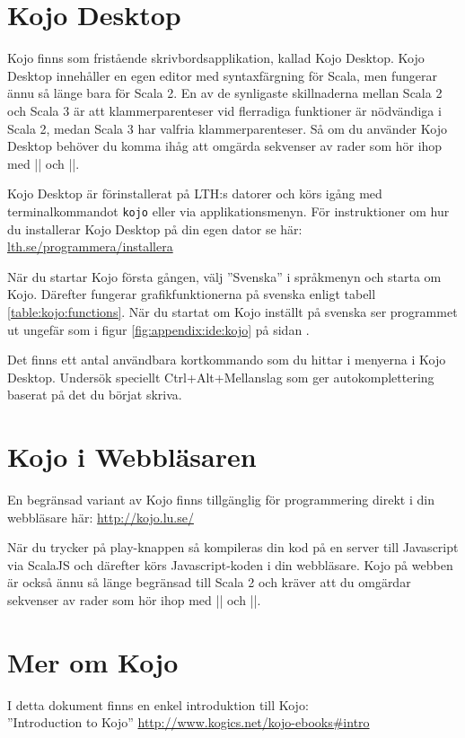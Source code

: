 \section{Kojo Desktop}

Kojo finns som fristående skrivbordsapplikation, kallad Kojo Desktop. Kojo Desktop innehåller en egen editor med syntaxfärgning för Scala, men fungerar ännu så länge bara för Scala 2. En av de synligaste skillnaderna mellan Scala 2 och Scala 3 är att klammerparenteser vid flerradiga funktioner är nödvändiga i Scala 2, medan Scala 3 har valfria klammerparenteser. Så om du använder Kojo Desktop behöver du komma ihåg att omgärda sekvenser av rader som hör ihop med \code|{| och \code|}|. 

Kojo Desktop är förinstallerat på LTH:s datorer och körs igång med terminalkommandot \texttt{kojo} eller via applikationsmenyn.  För instruktioner om hur du installerar Kojo Desktop på din egen dator se här: \href{http://www.lth.se/programmera/installera/}{lth.se/programmera/installera}

När du startar Kojo första gången, välj ''Svenska'' i språkmenyn och starta om Kojo. Därefter fungerar grafikfunktionerna på svenska enligt tabell \ref{table:kojo:functions}. När du startat om Kojo inställt på svenska ser programmet ut ungefär som i figur \ref{fig:appendix:ide:kojo} på sidan \pageref{fig:appendix:ide:kojo}.

Det finns ett antal användbara kortkommando som du hittar i menyerna i Kojo Desktop. Undersök speciellt Ctrl+Alt+Mellanslag som ger autokomplettering baserat på det du börjat skriva.

\section{Kojo i Webbläsaren}

En begränsad variant av Kojo finns tillgänglig för programmering direkt i din webbläsare här: \url{http://kojo.lu.se/}

När du trycker på play-knappen så kompileras din kod på en server till Javascript via ScalaJS och därefter körs Javascript-koden i din webbläsare. 
Kojo på webben är också ännu så länge begränsad till Scala 2 och kräver att du omgärdar sekvenser av rader som hör ihop med \code|{| och \code|}|.


\section{Mer om Kojo}

I detta dokument finns en enkel introduktion till Kojo: \\ ''Introduction to Kojo'' \url{http://www.kogics.net/kojo-ebooks#intro}
